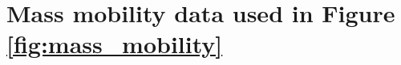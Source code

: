 \documentclass[12pt]{article}
\begin{document}



\section{Mass mobility data used in Figure \ref{fig:mass_mobility}}
\end{document}
